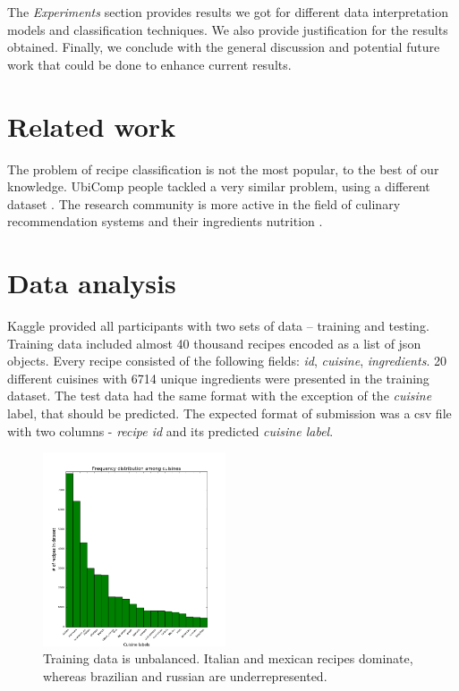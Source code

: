 \documentclass[prodmode,acmtap]{acmlarge}
\begin{document}
The \textit{Experiments} section provides results we got for different data interpretation models and classification techniques. We also provide justification for the results obtained. Finally, we conclude with the general discussion and potential future work that could be done to enhance current results. 

\section{Related work}
The problem of recipe classification is not the most popular, to the best of our knowledge. UbiComp people tackled a very similar problem, using a different dataset \cite{ubicomp}. The research community is more active in the field of culinary recommendation systems and their ingredients nutrition \cite{nutrition}.


\section{Data analysis}
Kaggle provided all participants with two sets of data -- training and testing. Training data included almost 40 thousand recipes encoded as a list of json objects. Every recipe consisted of the following fields: \textit{id}, \textit{cuisine}, \textit{ingredients}. 20 different cuisines with 6714
unique ingredients were presented in the training dataset. The test data had the same format with the exception of the \textit{cuisine} label, that should be predicted. The expected format of submission was a csv file with two columns - \textit{recipe id} and its predicted \textit{cuisine label}.

\begin{figure}
  \begin{center}
    \includegraphics[width=0.48\textwidth]{cuisine_freq_hist_green_wlabels}
  \end{center}
  \caption{Training data is unbalanced. Italian and mexican recipes dominate, whereas brazilian and russian are underrepresented.}
\end{figure}
\end{document}

